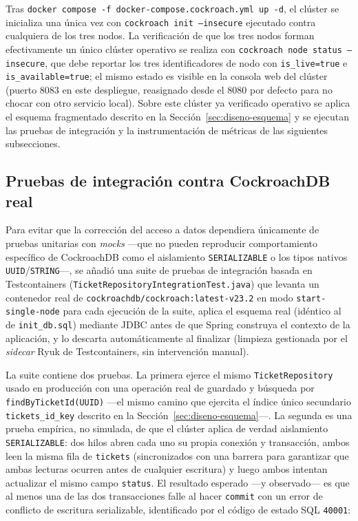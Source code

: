 \documentclass[11pt,letterpaper]{article}
\begin{document}
Tras \texttt{docker compose -f docker-compose.cockroach.yml up -d}, el clúster se inicializa una
única vez con \texttt{cockroach init --insecure} ejecutado contra cualquiera de los tres nodos.
La verificación de que los tres nodos forman efectivamente un único clúster operativo se realiza
con \texttt{cockroach node status --insecure}, que debe reportar los tres identificadores de nodo
con \texttt{is\_live=true} e \texttt{is\_available=true}; el mismo estado es visible en la consola
web del clúster (puerto 8083 en este despliegue, reasignado desde el 8080 por defecto para no
chocar con otro servicio local). Sobre este clúster ya verificado operativo se aplica el esquema
fragmentado descrito en la Sección~\ref{sec:diseno-esquema} y se ejecutan las pruebas de
integración y la instrumentación de métricas de las siguientes subsecciones.

\subsection{Pruebas de integración contra CockroachDB real}

Para evitar que la corrección del acceso a datos dependiera únicamente de pruebas unitarias con
\emph{mocks} —que no pueden reproducir comportamiento específico de CockroachDB como el
aislamiento \texttt{SERIALIZABLE} o los tipos nativos \texttt{UUID}/\texttt{STRING}—, se añadió una
suite de pruebas de integración basada en Testcontainers
(\texttt{TicketRepositoryIntegrationTest.java}) que levanta un contenedor real de
\texttt{cockroachdb/cockroach:latest-v23.2} en modo \texttt{start-single-node} para cada ejecución
de la suite, aplica el esquema real (idéntico al de \texttt{init\_db.sql}) mediante JDBC antes de
que Spring construya el contexto de la aplicación, y lo descarta automáticamente al finalizar
(limpieza gestionada por el \emph{sidecar} Ryuk de Testcontainers, sin intervención manual).

La suite contiene dos pruebas. La primera ejerce el mismo \texttt{TicketRepository} usado en
producción con una operación real de guardado y búsqueda por \texttt{findByTicketId(UUID)} —el
mismo camino que ejercita el índice único secundario \texttt{tickets\_id\_key} descrito en la
Sección~\ref{sec:diseno-esquema}—. La segunda es una prueba empírica, no simulada, de que el
clúster aplica de verdad aislamiento \texttt{SERIALIZABLE}: dos hilos abren cada uno su propia
conexión y transacción, ambos leen la misma fila de \texttt{tickets} (sincronizados con una
barrera para garantizar que ambas lecturas ocurren antes de cualquier escritura) y luego ambos
intentan actualizar el mismo campo \texttt{status}. El resultado esperado —y observado— es que al
menos una de las dos transacciones falle al hacer \texttt{commit} con un error de conflicto de
escritura serializable, identificado por el código de estado SQL \texttt{40001}:
\end{document}
